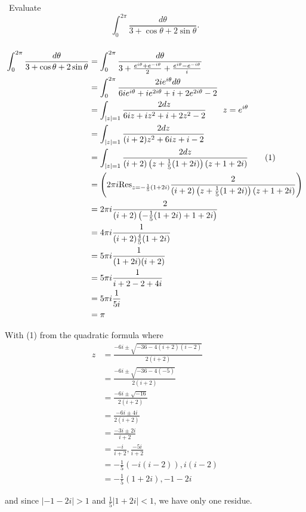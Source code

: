 \documentclass[12pt]{Qual}
\begin{document}
\begin{problem} $\,$
Evaluate $$\int_0^{2\pi}\frac{d\theta}{3+\cos\theta+2\sin\theta}.$$
\end{problem}


\begin{solution}$\,$
\begin{align*}
    \int_0^{2\pi}\frac{d\theta}{3+\cos\theta+2\sin\theta}&=\int_0^{2\pi}\frac{d\theta}{3+\frac{e^{i\theta}+e^{-i\theta}}{2}+\frac{e^{i\theta}-e^{-i\theta}}{i}}\\
    &=\int_0^{2\pi}\frac{2ie^{i\theta}d\theta}{6ie^{i\theta}+ie^{2i\theta}+i+2e^{2i\theta}-2}\\
    &=\int_{|z|=1}\frac{2dz}{6iz+iz^2+i+2z^2-2}\qquad z=e^{i\theta}\\
    &=\int_{|z|=1}\frac{2dz}{(i+2)z^2+6iz+i-2}\\
    &=\int_{|z|=1}\frac{2dz}{(i+2)\left(z+\frac{1}{5}(1+2i)\right)(z+1+2i)}\tag{1}\\
    &=\left(2\pi i\text{Res}_{z=-\frac{1}{5}(1+2i)}\frac{2}{(i+2)\left(z+\frac{1}{5}(1+2i)\right)(z+1+2i)}\right)\\
    &=2\pi i \frac{2}{(i+2)\left(-\frac{1}{5}(1+2i)+1+2i\right)}\\
    &=4\pi i\frac{1}{(i+2)\frac{4}{5}(1+2i)}\\
    &=5\pi i\frac{1}{(1+2i)(i+2)}\\
    &=5\pi i\frac{1}{i+2-2+4i}\\
    &=5\pi i\frac{1}{5i}\\
    &=\pi
\end{align*}

With (1) from the quadratic formula where \begin{align*}
    z&=\frac{-6i\pm\sqrt{-36-4(i+2)(i-2)}}{2(i+2)}\\
    &=\frac{-6i\pm\sqrt{-36-4(-5)}}{2(i+2)}\\
    &=\frac{-6i\pm\sqrt{-16}}{2(i+2)}\\
    &=\frac{-6i\pm 4i}{2(i+2)}\\
    &=\frac{-3i\pm 2i}{i+2}\\
    &=\frac{-i}{i+2},\frac{-5i}{i+2}\\
    &=-\frac{1}{5}(-i(i-2)),i(i-2)\\
    &=-\frac{1}{5}(1+2i),-1-2i
\end{align*}

and since $|-1-2i|>1$ and $\frac{1}{5}|1+2i|<1$, we have only one residue.
\end{solution}
\newpage
\end{document}
